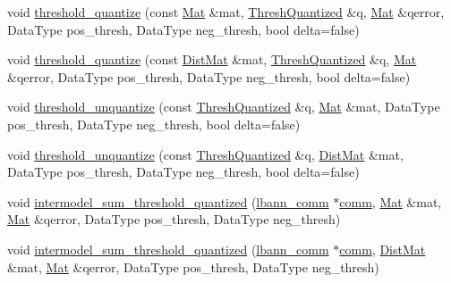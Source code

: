 \begin{DoxyCompactItemize}
\item 
void \hyperlink{classlbann_1_1lbann__quantizer_a00106e69ea8a6dfe9e9a91c75b845bcd}{threshold\+\_\+quantize} (const \hyperlink{base_8hpp_a68f11fdc31b62516cb310831bbe54d73}{Mat} \&mat, \hyperlink{classlbann_1_1lbann__quantizer_a85ea8e298c2975b4f802855278406aa7}{Thresh\+Quantized} \&q, \hyperlink{base_8hpp_a68f11fdc31b62516cb310831bbe54d73}{Mat} \&qerror, Data\+Type pos\+\_\+thresh, Data\+Type neg\+\_\+thresh, bool delta=false)
\item 
void \hyperlink{classlbann_1_1lbann__quantizer_ae9949af6bec1e95adf5a32ba9bb4afd8}{threshold\+\_\+quantize} (const \hyperlink{base_8hpp_a0fab5387556805cfeac3e7e567bf66c5}{Dist\+Mat} \&mat, \hyperlink{classlbann_1_1lbann__quantizer_a85ea8e298c2975b4f802855278406aa7}{Thresh\+Quantized} \&q, \hyperlink{base_8hpp_a68f11fdc31b62516cb310831bbe54d73}{Mat} \&qerror, Data\+Type pos\+\_\+thresh, Data\+Type neg\+\_\+thresh, bool delta=false)
\item 
void \hyperlink{classlbann_1_1lbann__quantizer_a0f5f3b0149715ab59202b8884a87c7d5}{threshold\+\_\+unquantize} (const \hyperlink{classlbann_1_1lbann__quantizer_a85ea8e298c2975b4f802855278406aa7}{Thresh\+Quantized} \&q, \hyperlink{base_8hpp_a68f11fdc31b62516cb310831bbe54d73}{Mat} \&mat, Data\+Type pos\+\_\+thresh, Data\+Type neg\+\_\+thresh, bool delta=false)
\item 
void \hyperlink{classlbann_1_1lbann__quantizer_a2324bba3cbb6c0d3e51bbe21555e7f1a}{threshold\+\_\+unquantize} (const \hyperlink{classlbann_1_1lbann__quantizer_a85ea8e298c2975b4f802855278406aa7}{Thresh\+Quantized} \&q, \hyperlink{base_8hpp_a0fab5387556805cfeac3e7e567bf66c5}{Dist\+Mat} \&mat, Data\+Type pos\+\_\+thresh, Data\+Type neg\+\_\+thresh, bool delta=false)
\item 
void \hyperlink{classlbann_1_1lbann__quantizer_a0bd572557675705c5e080b92d74b02ae}{intermodel\+\_\+sum\+\_\+threshold\+\_\+quantized} (\hyperlink{classlbann_1_1lbann__comm}{lbann\+\_\+comm} $\ast$\hyperlink{file__io_8cpp_ab048c6f9fcbcfaa57ce68b00263dbebe}{comm}, \hyperlink{base_8hpp_a68f11fdc31b62516cb310831bbe54d73}{Mat} \&mat, \hyperlink{base_8hpp_a68f11fdc31b62516cb310831bbe54d73}{Mat} \&qerror, Data\+Type pos\+\_\+thresh, Data\+Type neg\+\_\+thresh)
\item 
void \hyperlink{classlbann_1_1lbann__quantizer_ac2afc78996f35d90b5d0462292a1a2e3}{intermodel\+\_\+sum\+\_\+threshold\+\_\+quantized} (\hyperlink{classlbann_1_1lbann__comm}{lbann\+\_\+comm} $\ast$\hyperlink{file__io_8cpp_ab048c6f9fcbcfaa57ce68b00263dbebe}{comm}, \hyperlink{base_8hpp_a0fab5387556805cfeac3e7e567bf66c5}{Dist\+Mat} \&mat, \hyperlink{base_8hpp_a68f11fdc31b62516cb310831bbe54d73}{Mat} \&qerror, Data\+Type pos\+\_\+thresh, Data\+Type neg\+\_\+thresh)

\end{DoxyCompactItemize}
